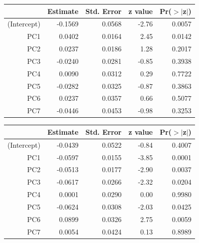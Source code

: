 \documentclass[a4paper,12pt]{Latex/Classes/PhDthesisPSnPDF}
\begin{document}
\newpage
\begin{center}
\begin{table}[ht]
\centering
\begin{tabular}{rrrrr}
  \hline
 & Estimate & Std. Error & z value & Pr($>$$|$z$|$) \\ 
  \hline
(Intercept) & -0.1569 & 0.0568 & -2.76 & 0.0057 \\ 
  PC1 & 0.0402 & 0.0164 & 2.45 & 0.0142 \\ 
  PC2 & 0.0237 & 0.0186 & 1.28 & 0.2017 \\ 
  PC3 & -0.0240 & 0.0281 & -0.85 & 0.3938 \\ 
  PC4 & 0.0090 & 0.0312 & 0.29 & 0.7722 \\ 
  PC5 & -0.0282 & 0.0325 & -0.87 & 0.3863 \\ 
  PC6 & 0.0237 & 0.0357 & 0.66 & 0.5077 \\ 
  PC7 & -0.0446 & 0.0453 & -0.98 & 0.3253 \\ 
   \hline
\end{tabular}
\end{table}\end{center}
\begin{center}
\begin{table}[ht]
\centering
\begin{tabular}{rrrrr}
  \hline
 & Estimate & Std. Error & z value & Pr($>$$|$z$|$) \\ 
  \hline
(Intercept) & -0.0439 & 0.0522 & -0.84 & 0.4007 \\ 
  PC1 & -0.0597 & 0.0155 & -3.85 & 0.0001 \\ 
  PC2 & -0.0513 & 0.0177 & -2.90 & 0.0037 \\ 
  PC3 & -0.0617 & 0.0266 & -2.32 & 0.0204 \\ 
  PC4 & 0.0001 & 0.0290 & 0.00 & 0.9980 \\ 
  PC5 & -0.0624 & 0.0308 & -2.03 & 0.0425 \\ 
  PC6 & 0.0899 & 0.0326 & 2.75 & 0.0059 \\ 
  PC7 & 0.0054 & 0.0424 & 0.13 & 0.8989 \\ 
   \hline
\end{tabular}
\end{table}\end{center}
\end{document}
